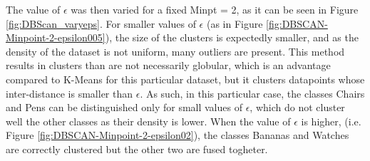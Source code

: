 \documentclass[a4paper,10pt]{article}
\begin{document}
The value of $\epsilon$ was then varied for a fixed Minpt = 2, as it can be seen in Figure \ref{fig:DBScan_varyeps}.
For smaller values of $\epsilon$ (as in Figure \ref{fig:DBSCAN-Minpoint-2-epsilon005}), the size of the clusters is expectedly smaller, and as the density of the dataset is not uniform, many outliers are present. This method results in  clusters than are not necessarily globular, which is an advantage compared to K-Means for this particular dataset, but it clusters datapoints whose inter-distance is smaller than $\epsilon$. As such, in this particular case, the classes Chairs and Pens can be distinguished only for small values of $\epsilon$, which do not cluster well the other classes as their density is lower. When the value of $\epsilon$ is higher, (i.e. Figure \ref{fig:DBSCAN-Minpoint-2-epsilon02}), the classes Bananas and Watches are correctly clustered but the other two are fused togheter.
\end{document}
